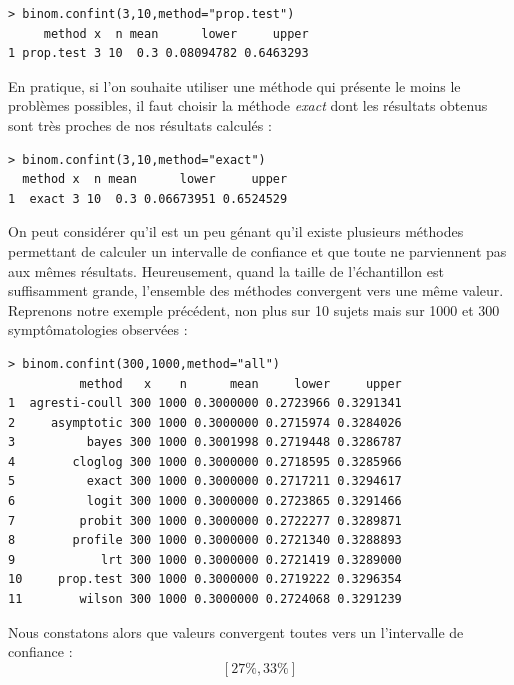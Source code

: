 \begin{lstlisting}[language=html]
> binom.confint(3,10,method="prop.test")
     method x  n mean      lower     upper
1 prop.test 3 10  0.3 0.08094782 0.6463293
\end{lstlisting}
En pratique, si l'on souhaite utiliser une méthode qui présente le moins le problèmes possibles, il faut choisir la méthode \textit{exact} dont les résultats obtenus sont très proches de nos résultats calculés : 
\begin{lstlisting}[language=html]
> binom.confint(3,10,method="exact")
  method x  n mean      lower     upper
1  exact 3 10  0.3 0.06673951 0.6524529
\end{lstlisting}
On peut considérer qu'il est un peu génant qu'il existe plusieurs méthodes permettant de calculer un intervalle de confiance et que toute ne parviennent pas aux mêmes résultats. \newline
Heureusement, quand la taille de l'échantillon est suffisamment grande, l'ensemble des méthodes convergent vers une même valeur. Reprenons notre exemple précédent, non plus sur 10 sujets mais sur 1000 et 300 symptômatologies observées : 
\begin{lstlisting}[language=html]
> binom.confint(300,1000,method="all")
          method   x    n      mean     lower     upper
1  agresti-coull 300 1000 0.3000000 0.2723966 0.3291341
2     asymptotic 300 1000 0.3000000 0.2715974 0.3284026
3          bayes 300 1000 0.3001998 0.2719448 0.3286787
4        cloglog 300 1000 0.3000000 0.2718595 0.3285966
5          exact 300 1000 0.3000000 0.2717211 0.3294617
6          logit 300 1000 0.3000000 0.2723865 0.3291466
7         probit 300 1000 0.3000000 0.2722277 0.3289871
8        profile 300 1000 0.3000000 0.2721340 0.3288893
9            lrt 300 1000 0.3000000 0.2721419 0.3289000
10     prop.test 300 1000 0.3000000 0.2719222 0.3296354
11        wilson 300 1000 0.3000000 0.2724068 0.3291239
\end{lstlisting}

Nous constatons alors que valeurs convergent toutes vers un l'intervalle de confiance : $$ [27\%,33\%]$$
\newpage
